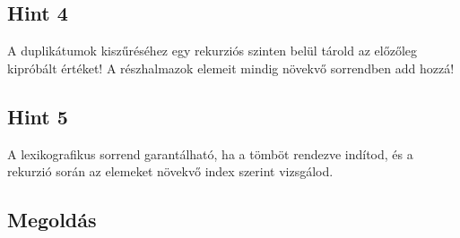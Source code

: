 \documentclass[12pt,a4paper]{article}
\begin{document}
\subsection*{Hint 4}
A duplikátumok kiszűréséhez egy rekurziós szinten belül tárold az előzőleg kipróbált értéket! A részhalmazok elemeit mindig növekvő sorrendben add hozzá!

\subsection*{Hint 5}
A lexikografikus sorrend garantálható, ha a tömböt rendezve indítod, és a rekurzió során az elemeket növekvő index szerint vizsgálod.

\subsection*{Megoldás}
\end{document}
